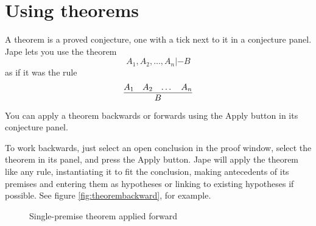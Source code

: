 \documentclass[11pt]{book}
\newcommand{\figref}[1]{figure \ref{fig:#1}}
\begin{document}
\section{Using theorems}

A theorem is a proved conjecture, one with a tick next to it in a conjecture panel. Jape lets you use the theorem
\begin{equation*}
A_{1},A_{2},\dots,A_{n}|-B
\end{equation*}
as if it was the rule
\begin{equation*}
\infer{B}
      {A_{1} & A_{2} & \dots & A_{n}}
\end{equation*}
You can apply a theorem backwards  or forwards using the Apply button in its conjecture panel.  

To work backwards, just select an open conclusion in the proof window, select the theorem in its panel, and press the Apply button. Jape will apply the theorem like any rule, instantiating it to fit the conclusion, making antecedents of its premises and entering them as hypotheses or linking to existing hypotheses if possible. See \figref{theorembackward}, for example.

\begin{figure}
\centering
{}
\qquad
{}
\caption{Single-premise theorem applied forward}
\label{fig:singlepremisetheoremforward}
\end{figure}
\end{document}
